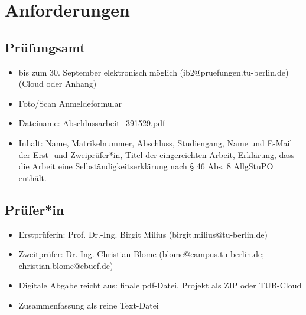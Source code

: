 \section*{Anforderungen}
\subsection*{Prüfungsamt}
\begin{itemize}
\item bis zum 30. September elektronisch möglich (ib2@pruefungen.tu-berlin.de) (Cloud oder Anhang)
\item Foto/Scan Anmeldeformular
\item Dateiname: Abschlussarbeit\_391529.pdf
\item Inhalt: Name, Matrikelnummer, Abschluss, Studiengang, Name und E-Mail der Erst- und Zweiprüfer*in, Titel der eingereichten Arbeit, Erklärung, dass die Arbeit eine Selbständigkeitserklärung nach § 46 Abs. 8 AllgStuPO enthält.
\end{itemize}
\subsection*{Prüfer*in}
\begin{itemize}
\item Erstprüferin: Prof. Dr.-Ing. Birgit Milius (birgit.milius@tu-berlin.de)
\item Zweitprüfer: Dr.-Ing. Christian Blome (blome@campus.tu-berlin.de; christian.blome@ebuef.de)
\item Digitale Abgabe reicht aus: finale pdf-Datei, Projekt als ZIP oder TUB-Cloud
\item Zusammenfassung als reine Text-Datei
\end{itemize}